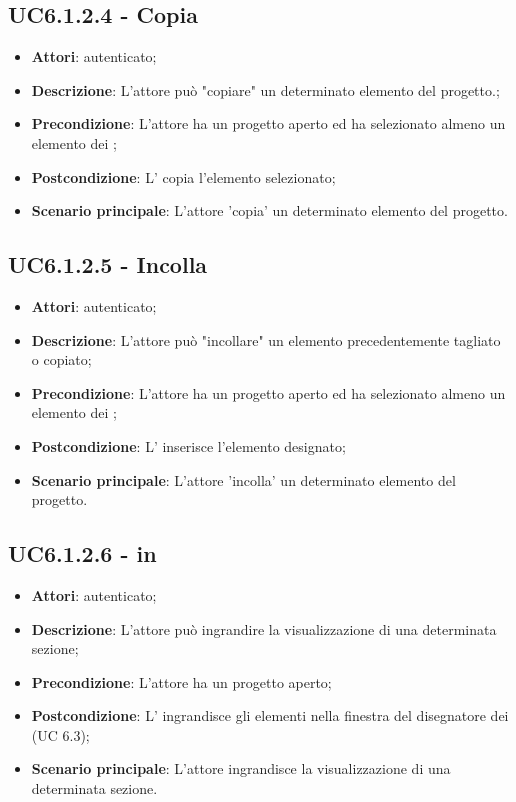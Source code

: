 \subsection{UC6.1.2.4 - Copia}
\label{ssec:UC6.1.2.4}
\begin{itemize}
\item \textbf{Attori}:  autenticato;
\item \textbf{Descrizione}: L’attore può "copiare" un determinato elemento del progetto.;
\item \textbf{Precondizione}: L’attore ha un progetto aperto ed ha selezionato almeno un elemento dei ;
\item \textbf{Postcondizione}: L’ copia l’elemento selezionato;
\item \textbf{Scenario principale}: L'attore 'copia' un determinato elemento del progetto.
\end{itemize}
\subsection{UC6.1.2.5 - Incolla}
\label{ssec:UC6.1.2.5}
\begin{itemize}
\item \textbf{Attori}:  autenticato;
\item \textbf{Descrizione}: L’attore può "incollare" un elemento precedentemente tagliato o copiato;
\item \textbf{Precondizione}: L’attore ha un progetto aperto ed ha selezionato almeno un elemento dei ;
\item \textbf{Postcondizione}: L’ inserisce l’elemento designato;
\item \textbf{Scenario principale}: L'attore 'incolla' un determinato elemento del progetto.
\end{itemize}
\subsection{UC6.1.2.6 -  in}
\label{ssec:UC6.1.2.6}
\begin{itemize}
\item \textbf{Attori}:  autenticato;
\item \textbf{Descrizione}: L’attore può ingrandire la visualizzazione di una determinata sezione;
\item \textbf{Precondizione}: L’attore ha un progetto aperto;
\item \textbf{Postcondizione}: L’ ingrandisce gli elementi nella finestra del disegnatore dei  (UC 6.3);
\item \textbf{Scenario principale}: L'attore ingrandisce la visualizzazione di una determinata sezione.
\end{itemize}
